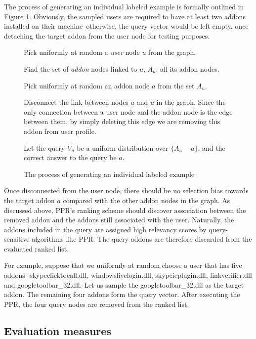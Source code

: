 \documentclass[11pt,oneside]{book}
\let\Oldsubsection\subsection
\renewcommand{\subsection}{\FloatBarrier\Oldsubsection}
\begin{document}
The process of generating an individual labeled example is formally outlined in Figure \ref{fig:example-gen}. Obviously, the sampled users are required to have at least two addons installed on their machine--otherwise, the query vector would be left empty, once detaching the target addon from the user node for testing purposes. 

\begin{figure}
\begin{enumerate}[(a)]
\begin{small}
\item Pick uniformly at random a {\it user} node $u$ from the graph.
\item Find the set of {\it addon} nodes linked to $u$, $A_u$.
  all its addon nodes.
\item Pick uniformly at random an addon node $a$ from the set $A_u$. 
\item Disconnect the link between nodes $a$ and $u$ in the
  graph. Since the only connection between a user node and the addon
  node is the edge between them, by simply deleting this edge we are
  removing this addon from user profile.
\item Let the query $V_u$ be a uniform distribution over $\{A_u-a\}$,
  and the correct answer to the query be $a$. 
\end{small}
\end{enumerate}
\caption{The process of generating an individual labeled example}
\label{fig:example-gen}
\end{figure}

Once disconnected from the user node, there should be no selection bias towards the target addon $a$ compared with the other addon nodes in the graph. As discussed above, PPR's ranking scheme should discover association between the removed addon and the addons still associated with the user. Naturally, the addons included in the query are assigned high relevancy scores by query-sensitive algorithms like PPR. The query addons are therefore discarded from the evaluated ranked list. 

For example, suppose that we uniformly at random choose a user that has five addons -skypeclicktocall.dll, windowslivelogin.dll, skypeieplugin.dll, linkverifier.dll and googletoolbar\_32.dll. Let us sample the googletoolbar\_32.dll as the target addon. The remaining four addons form the query vector. After executing the PPR, the four query nodes are removed from the ranked list.

\subsection{Evaluation measures}
\end{document}
